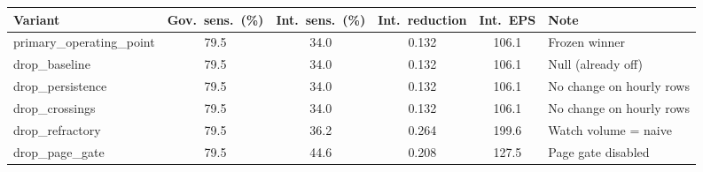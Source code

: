 \begin{tabular}{@{}lccccp{3.4cm}@{}}
\toprule
Variant & Gov.\ sens.\ (\%) & Int.\ sens.\ (\%) & Int.\ reduction & Int.\ EPS & Note \\
\midrule
primary\_operating\_point & 79.5 & 34.0 & 0.132 & 106.1 & Frozen winner \\
drop\_baseline & 79.5 & 34.0 & 0.132 & 106.1 & Null (already off) \\
drop\_persistence & 79.5 & 34.0 & 0.132 & 106.1 & No change on hourly rows \\
drop\_crossings & 79.5 & 34.0 & 0.132 & 106.1 & No change on hourly rows \\
drop\_refractory & 79.5 & 36.2 & 0.264 & 199.6 & Watch volume = naive \\
drop\_page\_gate & 79.5 & 44.6 & 0.208 & 127.5 & Page gate disabled \\
\bottomrule
\end{tabular}
